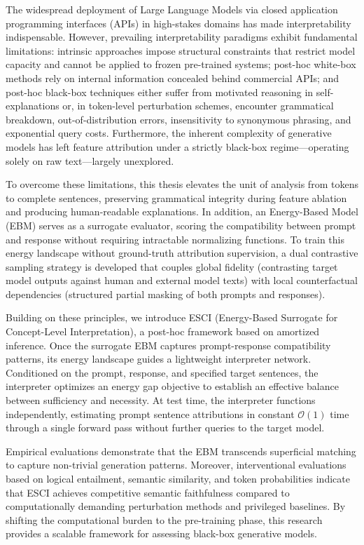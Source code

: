 \begin{englishabstract}
The widespread deployment of Large Language Models via closed application programming interfaces (APIs) in high-stakes domains has made interpretability indispensable. However, prevailing interpretability paradigms exhibit fundamental limitations: intrinsic approaches impose structural constraints that restrict model capacity and cannot be applied to frozen pre-trained systems; post-hoc white-box methods rely on internal information concealed behind commercial APIs; and post-hoc black-box techniques either suffer from motivated reasoning in self-explanations or, in token-level perturbation schemes, encounter grammatical breakdown, out-of-distribution errors, insensitivity to synonymous phrasing, and exponential query costs. Furthermore, the inherent complexity of generative models has left feature attribution under a strictly black-box regime---operating solely on raw text---largely unexplored.

To overcome these limitations, this thesis elevates the unit of analysis from tokens to complete sentences, preserving grammatical integrity during feature ablation and producing human-readable explanations. In addition, an Energy-Based Model (EBM) serves as a surrogate evaluator, scoring the compatibility between prompt and response without requiring intractable normalizing functions. To train this energy landscape without ground-truth attribution supervision, a dual contrastive sampling strategy is developed that couples global fidelity (contrasting target model outputs against human and external model texts) with local counterfactual dependencies (structured partial masking of both prompts and responses).

Building on these principles, we introduce ESCI (Energy-Based Surrogate for Concept-Level Interpretation), a post-hoc framework based on amortized inference. Once the surrogate EBM captures prompt-response compatibility patterns, its energy landscape guides a lightweight interpreter network. Conditioned on the prompt, response, and specified target sentences, the interpreter optimizes an energy gap objective to establish an effective balance between sufficiency and necessity. At test time, the interpreter functions independently, estimating prompt sentence attributions in constant $\mathcal{O}(1)$ time through a single forward pass without further queries to the target model.

Empirical evaluations demonstrate that the EBM transcends superficial matching to capture non-trivial generation patterns. Moreover, interventional evaluations based on logical entailment, semantic similarity, and token probabilities indicate that ESCI achieves competitive semantic faithfulness compared to computationally demanding perturbation methods and privileged baselines. By shifting the computational burden to the pre-training phase, this research provides a scalable framework for assessing black-box generative models.

\end{englishabstract}
